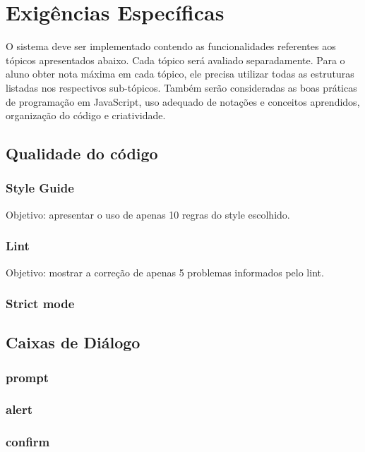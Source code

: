 \chapter{Exigências Específicas}
	O sistema deve ser implementado contendo as funcionalidades referentes aos tópicos apresentados abaixo. Cada tópico será avaliado separadamente. Para o aluno obter nota máxima em cada tópico, ele precisa utilizar todas as estruturas listadas nos respectivos sub-tópicos. Também serão consideradas as boas práticas de programação em JavaScript, uso adequado de notações e conceitos aprendidos, organização do código e criatividade.

\section{Qualidade do código}


\subsection{Style Guide}
	Objetivo: apresentar o uso de apenas 10 regras do style escolhido.

\subsection{Lint}
	Objetivo: mostrar a correção de apenas 5 problemas informados pelo lint.

\subsection{Strict mode}
	


\section{Caixas de Diálogo}

\subsection{prompt}

\subsection{alert}

\subsection{confirm}

